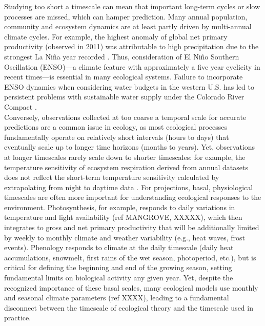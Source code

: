 \documentclass[11pt,a4paper,oneside]{article}
\begin{document}
Studying too short a timescale can mean that important long-term cycles or slow processes are missed, which can hamper prediction. Many annual population, community and ecosystem dynamics are at least partly driven by multi-annual climate cycles. For example, the highest anomaly of global net primary productivity (observed in 2011) was attributable to high precipitation due to the strongest La Ni\~na year recorded \citep{bastos2013}. Thus, consideration of El Ni\~no Southern Oscillation (ENSO)---a climate feature with approximately a five year cyclicity in recent times---is essential in many ecological systems. Failure to incorporate ENSO dynamics when considering water budgets in the western U.S. has led to persistent problems with sustainable water supply under the Colorado River Compact \citep{Christensen2004}.\\

Conversely, observations collected at too coarse a temporal scale for accurate predictions are a common issue in ecology, as most ecological processes fundamentally operate on relatively short intervals (hours to days) that eventually scale up to longer time horizons (months to years). Yet, observations at longer timescales rarely scale down to shorter timescales: for example, the temperature sensitivity of ecosystem respiration derived from annual datasets does not reflect the short-term temperature sensitivity calculated by extrapolating from night to daytime data \citep{Reichstein2005}. For projections, basal, physiological timescales are often more important for understanding ecological responses to the environment. Photosynthesis, for example, responds to daily variations in temperature and light availability (ref MANGROVE, XXXXX), which then integrates to gross and net primary productivity that will be additionally limited by weekly to monthly climate and weather variability (e.g., heat waves, frost events). Phenology responds to climate at the daily timescale (daily heat accumulations, snowmelt, first rains of the wet season, photoperiod, etc.), but is critical for defining the beginning and end of the growing season, setting fundamental limits on biological activity any given year. Yet, despite the recognized importance of these basal scales, many ecological models use monthly and seasonal climate parameters (ref XXXX), leading to a fundamental disconnect between the timescale of ecological theory and the timescale used in practice.\\
\end{document}
